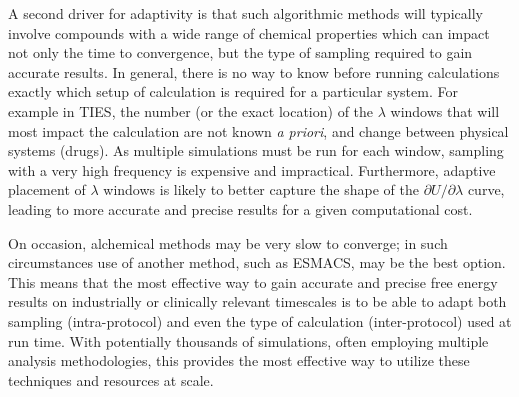 
A second driver for adaptivity is that such algorithmic methods  will
typically involve compounds with a wide range of chemical properties which can
impact not only the time to convergence, but the type of sampling required to
gain accurate results. In general, there is no way to know before running
calculations exactly which setup of calculation is required for a particular
system. For example in TIES, the number (or the exact location) of the
$\lambda$ windows that will most impact the calculation are not known
\textit{a priori}, and change between physical systems (drugs). As multiple
simulations must be run for each window, sampling with a very high frequency
is expensive and impractical. Furthermore, adaptive placement of $\lambda$
windows is likely to better capture the shape of the 
$\partial U/\partial\lambda$ curve, leading to more accurate and precise 
results for a given computational cost.

On occasion, alchemical methods may be very slow to converge; in such
circumstances use of another method, such as ESMACS, may be the best option.
This means that the most effective way to gain accurate and precise free
energy results on industrially or clinically relevant timescales is to be able
to adapt both sampling (intra-protocol) and even the type of calculation 
(inter-protocol) used at run time. With potentially thousands of simulations, 
often employing multiple analysis methodologies, this provides the most 
effective way to utilize these techniques and resources at scale.

